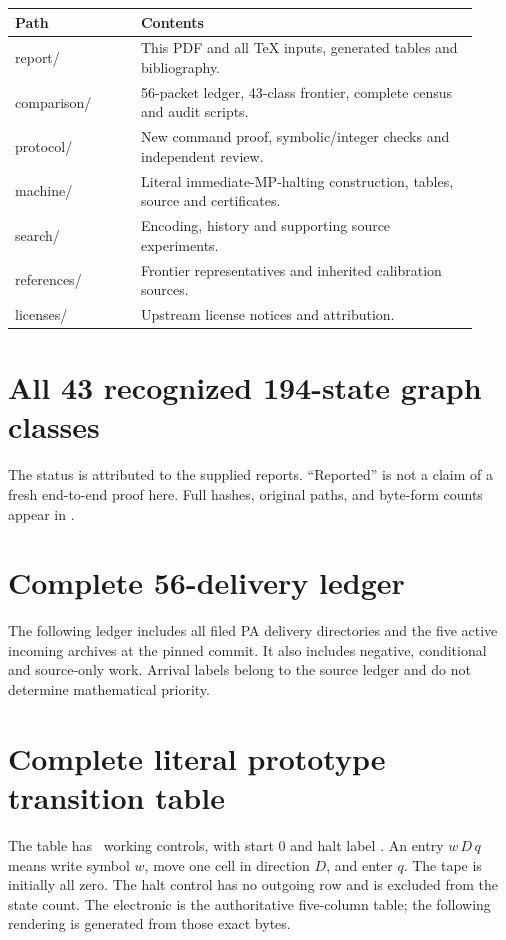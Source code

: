 \documentclass[11pt,letterpaper]{article}
\begin{document}
\begin{center}
\begin{tabular}{>{\ttfamily}p{0.25\linewidth}p{0.67\linewidth}}
\toprule
\normalfont Path & Contents\\\midrule
report/ & This PDF and all TeX inputs, generated tables and bibliography.\\
comparison/ & 56-packet ledger, 43-class frontier, complete census and audit scripts.\\
protocol/ & New command proof, symbolic/integer checks and independent review.\\
machine/ & Literal immediate-MP-halting construction, tables, source and certificates.\\
search/ & Encoding, history and supporting source experiments.\\
references/ & Frontier representatives and inherited calibration sources.\\
licenses/ & Upstream license notices and attribution.\\
\bottomrule
\end{tabular}
\end{center}


\appendix
\section{All 43 recognized 194-state graph classes}
\label{app:frontier}
The status is attributed to the supplied reports. ``Reported'' is not
a claim of a fresh end-to-end proof here. Full hashes, original paths,
and byte-form counts appear in .


\section{Complete 56-delivery ledger}
\label{app:ledger}
The following ledger includes all filed PA delivery directories and the
five active incoming archives at the pinned commit. It also includes
negative, conditional and source-only work. Arrival labels belong to the
source ledger and do not determine mathematical priority.


\section{Complete literal prototype transition table}
\label{app:machine}
The table has \prototypecount\ working controls, with start 0 and halt
label \prototypecount. An entry $w\,D\,q$ means write symbol $w$, move
one cell in direction $D$, and enter $q$. The tape is initially all zero.
The halt control has no outgoing row and is excluded from the state count.
The electronic  is the authoritative five-column table;
the following rendering is generated from those exact bytes.

\end{document}
